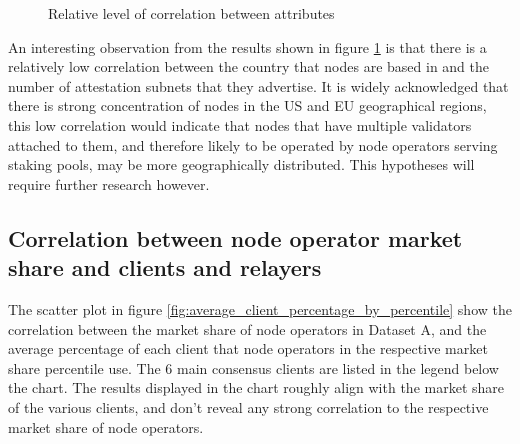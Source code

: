 \documentclass[conference]{IEEEtran}
\begin{document}
\begin{figure}[htbp]
    \centering
    \caption{Relative level of correlation between attributes}
    \label{fig:relative-level-of-correlation-between-attributes}
\end{figure}

An interesting observation from the results shown in figure \ref{fig:relative-level-of-correlation-between-attributes} is that there is a relatively low correlation between the country that nodes are based in and the number of attestation subnets that they advertise.  It is widely acknowledged that there is  strong concentration of nodes in the US and EU geographical regions, this low correlation would indicate that nodes that have multiple validators attached to them, and therefore likely to be operated by node operators serving staking pools, may be more geographically distributed.  This hypotheses will require further research however.

\subsection{Correlation between node operator market share and clients and relayers}

The scatter plot in figure \ref{fig:average_client_percentage_by_percentile} show the correlation between the market share of node operators in Dataset A, and the average percentage of each client that node operators in the respective market share percentile use.  The 6 main consensus clients are listed in the legend below the chart.  The results displayed in the chart roughly align with the market share of the various clients, and don't reveal any strong correlation to the respective market share of node operators.
\end{document}
